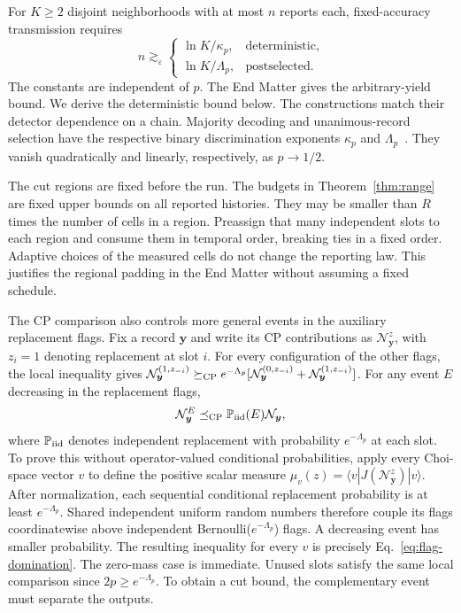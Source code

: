 \documentclass[aps,prl,twocolumn,superscriptaddress,longbibliography,reprint,floatfix]{revtex4-2}
\newcommand{\Prb}{\mathbb P}
\newcommand{\eps}{\varepsilon}
\begin{document}
For $K\ge2$ disjoint neighborhoods with at most $n$ reports each,
fixed-accuracy transmission requires
\begin{equation}
 n\gtrsim_\eps
 \begin{cases}
 \ln K/\kappa_p,&\text{deterministic},\\
 \ln K/\Lambda_p,&\text{postselected}.
 \end{cases}
 \label{eq:two-information-costs}
\end{equation}
The constants are independent of $p$. The End Matter gives the
arbitrary-yield bound. We derive the deterministic bound below. The constructions match their
detector dependence on a chain. Majority decoding and unanimous-record selection
have the respective binary discrimination exponents $\kappa_p$ and
$\Lambda_p$~\cite{Chernoff1952,DAnjou2021,Regula2024}.
They vanish quadratically and linearly, respectively, as $p\to1/2$.


The cut regions are fixed before the run. The budgets in
Theorem~\ref{thm:range} are fixed upper bounds on all
reported histories. They may be smaller than $R$ times the number of
cells in a region. Preassign that many independent slots to each
region and consume them in temporal order, breaking ties in a fixed order. Adaptive choices of the measured cells do not
change the reporting law. This justifies the regional padding in the
End Matter without assuming a fixed schedule.

The CP comparison also controls more general events in the auxiliary
replacement flags. Fix a record $\boldsymbol y$ and write its CP contributions
as $\mathcal N_{\boldsymbol y}^z$, with $z_i=1$ denoting replacement at slot $i$.
For every configuration of the other flags, the local inequality gives
$\mathcal N_{\boldsymbol y}^{(1,z_{-i})}\succeq_{\rm CP}
e^{-\Lambda_p}[\mathcal N_{\boldsymbol y}^{(0,z_{-i})}+\mathcal N_{\boldsymbol y}^{(1,z_{-i})}]$.
For any event $E$ decreasing in the replacement flags,
\begin{equation}
 \mathcal N_{\boldsymbol y}^E\preceq_{\rm CP}
       \Prb_{\rm iid}(E)\mathcal N_{\boldsymbol y},
 \label{eq:flag-domination}
\end{equation}
where $\Prb_{\rm iid}$ denotes independent replacement with probability
$e^{-\Lambda_p}$ at each slot. To prove this without operator-valued conditional probabilities,
apply every Choi-space vector $v$ to define the positive scalar measure
$\mu_v(z)=\langle v|J(\mathcal N_{\boldsymbol y}^z)|v\rangle$.
After normalization, each sequential conditional replacement probability
is at least $e^{-\Lambda_p}$. Shared independent uniform random numbers therefore
couple its flags coordinatewise above independent Bernoulli($e^{-\Lambda_p}$)
flags. A decreasing event has smaller probability. The resulting
inequality for every $v$ is precisely Eq.~\eqref{eq:flag-domination}.
The zero-mass case is immediate. Unused slots satisfy the same local
comparison since $2p\ge e^{-\Lambda_p}$. To obtain a cut bound,
the complementary event must separate the outputs.
\end{document}
